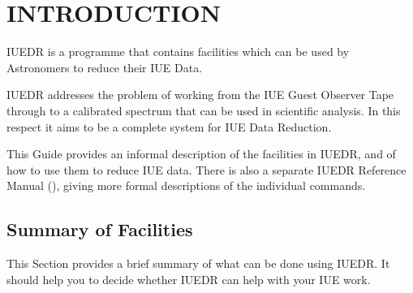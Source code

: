 \begin{latexonly}
   \setlength{\parskip}{0mm}
   \latexonlytoc
   \setlength{\parskip}{\medskipamount}
\end{latexonly}



\newpage
\renewcommand{\thepage}{\arabic{page}}
\setcounter{page}{1}
\section{\label{se:introduction}INTRODUCTION}

IUEDR is a programme that contains facilities which can be used by
Astronomers to reduce their IUE Data.

IUEDR addresses the problem of working from the IUE Guest Observer
Tape through to a calibrated spectrum that can be used in scientific
analysis.  In this respect it aims to be a complete system for IUE
Data Reduction.

This Guide provides an informal description of the facilities in IUEDR, and
of how to use them to reduce IUE data.  There is also a separate IUEDR
Reference Manual (), giving more formal descriptions of the
individual commands.


\subsection{Summary of Facilities}

This Section provides a brief summary of what can be done using IUEDR\@.  It
should help you to decide whether IUEDR can help with your IUE work.

